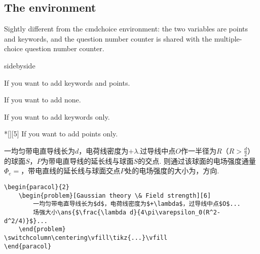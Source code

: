 \subsection{The  environment}
Sightly different from the cmd{choice} environment: the two variables are points and keywords, and the question number counter is shared with the multiple-choice question number counter.
\begin{tcblisting}{sidebyside}
    \begin{problem}[Keywords][5]
        If you want to add keywords and points.
    \end{problem}
    \begin{problem}
        If you want to add none.
    \end{problem}
    \begin{problem}[Keywords]
        If you want to add keywords only.
    \end{problem}
    \begin{problem}*[][5]
        If you want to add points only.
    \end{problem}
\end{tcblisting}

\begin{paracol}{2}
\begin{problem}
    一均匀带电直导线长为$d$，电荷线密度为$+\lambda$.过导线中点$O$作一半径为$R$（$R>\frac{d}{2}$）的球面$S$，$P$为带电直导线的延长线与球面$S$的交点. 则通过该球面的电场强度通量$\Phi_e=$，带电直线的延长线与球面交点$P$处的电场强度的大小为，方向.
    \end{problem}
\switchcolumn\centering
\vfill
{}
\vfill
\end{paracol}
\begin{verbatim}
\begin{paracol}{2}
    \begin{problem}[Gaussian theory \& Field strength][6]
        一均匀带电直导线长为$d$，电荷线密度为$+\lambda$，过导线中点$O$...
        场强大小\ans{$\frac{\lambda d}{4\pi\varepsilon_0(R^2-d^2/4)}$}...
    \end{problem}
\switchcolumn\centering\vfill\tikz{...}\vfill
\end{paracol}
\end{verbatim}

